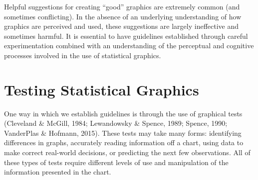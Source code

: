 \documentclass[print]{nuthesis}
\begin{document}
Helpful suggestions for creating ``good'' graphics are extremely common (and sometimes conflicting). In the absence of an underlying understanding of how graphics are perceived and used, these suggestions are largely ineffective and sometimes harmful. It is essential to have guidelines established through careful experimentation combined with an understanding of the perceptual and cognitive processes involved in the use of statistical graphics.

\hypertarget{testing-statistical-graphics}{%
\section{Testing Statistical Graphics}\label{testing-statistical-graphics}}

One way in which we establish guidelines is through the use of graphical tests (Cleveland \& McGill, 1984; Lewandowsky \& Spence, 1989; Spence, 1990; VanderPlas \& Hofmann, 2015).
These tests may take many forms: identifying differences in graphs, accurately reading information off a chart, using data to make correct real-world decisions, or predicting the next few observations.
All of these types of tests require different levels of use and manipulation of the information presented in the chart.
\end{document}
